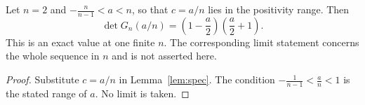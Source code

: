 \begin{theorem}\label{thm:main}
Let $n=2$ and $-\tfrac{n}{n-1}<a<n$, so that $c=a/n$ lies in the positivity range. Then
\[
\det G_n(a/n)=\left(1 - \frac{a}{2}\right) \left(\frac{a}{2} + 1\right).
\]
This is an exact value at one finite $n$. The corresponding limit statement concerns the whole sequence in $n$ and is not asserted here.
\end{theorem}
\begin{proof}
Substitute $c=a/n$ in Lemma~\ref{lem:spec}.
The condition $-\frac1{n-1}<\frac an<1$ is the stated range of $a$.
No limit is taken.
\end{proof}
